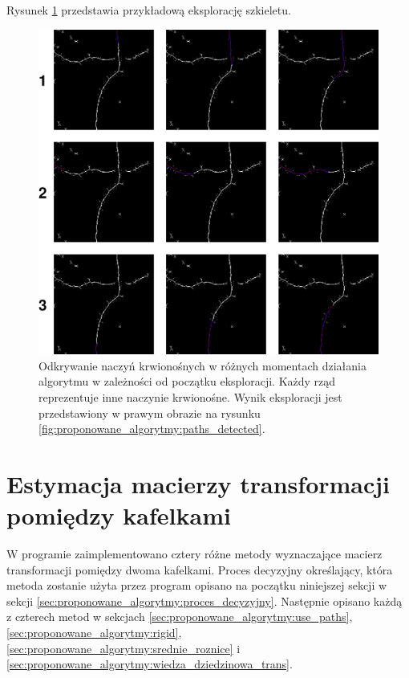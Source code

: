 Rysunek \ref{fig:proponowane_algorytmy:path_explor} przedstawia przykładową eksplorację szkieletu.

\begin{figure}[htb]
  \centering
  \includegraphics[width=\textwidth]{gfx/path_explor}
  \caption{Odkrywanie naczyń krwionośnych w różnych momentach działania algorytmu w zależności od początku eksploracji. Każdy rząd reprezentuje inne naczynie krwionośne. Wynik eksploracji jest przedstawiony w prawym obrazie na rysunku \ref{fig:proponowane_algorytmy:paths_detected}.}
  \label{fig:proponowane_algorytmy:path_explor}
\end{figure}

\section{Estymacja macierzy transformacji pomiędzy kafelkami}
\label{sec:proponowane_algorytmy:estymacja}

W programie zaimplementowano cztery różne metody wyznaczające macierz transformacji pomiędzy dwoma kafelkami. Proces decyzyjny określający, która metoda zostanie użyta przez program opisano na początku niniejszej sekcji w sekcji \ref{sec:proponowane_algorytmy:proces_decyzyjny}. Następnie opisano każdą z czterech metod w sekcjach \ref{sec:proponowane_algorytmy:use_paths}, \ref{sec:proponowane_algorytmy:rigid}, \ref{sec:proponowane_algorytmy:srednie_roznice} i \ref{sec:proponowane_algorytmy:wiedza_dziedzinowa_trans}.

